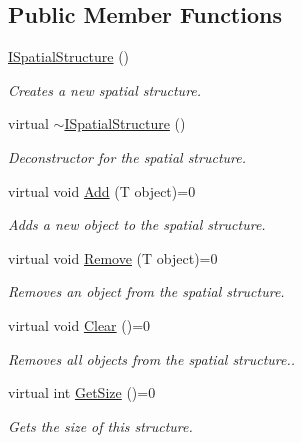 \subsection*{Public Member Functions}
\begin{DoxyCompactItemize}
\item 
\hyperlink{class_flounder_1_1_i_spatial_structure_a002f6e822881e5425bd8e6a66d69b5ed}{I\+Spatial\+Structure} ()
\begin{DoxyCompactList}\small\item\em Creates a new spatial structure. \end{DoxyCompactList}\item 
virtual \hyperlink{class_flounder_1_1_i_spatial_structure_a3638dc91c3f8aea686b7262957caf3d1}{$\sim$\+I\+Spatial\+Structure} ()
\begin{DoxyCompactList}\small\item\em Deconstructor for the spatial structure. \end{DoxyCompactList}\item 
virtual void \hyperlink{class_flounder_1_1_i_spatial_structure_a5e3e1c164fb928c74a266f6d0de6cc50}{Add} (T object)=0
\begin{DoxyCompactList}\small\item\em Adds a new object to the spatial structure. \end{DoxyCompactList}\item 
virtual void \hyperlink{class_flounder_1_1_i_spatial_structure_aa47044cd677489570390353b192156e0}{Remove} (T object)=0
\begin{DoxyCompactList}\small\item\em Removes an object from the spatial structure. \end{DoxyCompactList}\item 
virtual void \hyperlink{class_flounder_1_1_i_spatial_structure_a4a15975fe4c6505707a6d8c447809c76}{Clear} ()=0
\begin{DoxyCompactList}\small\item\em Removes all objects from the spatial structure.. \end{DoxyCompactList}\item 
virtual int \hyperlink{class_flounder_1_1_i_spatial_structure_ab638001c851bd7cf2525035ffa21b8b4}{Get\+Size} ()=0
\begin{DoxyCompactList}\small\item\em Gets the size of this structure. \end{DoxyCompactList}\item 

\end{DoxyCompactItemize}
